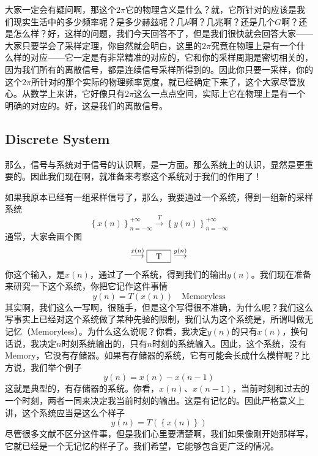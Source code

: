 \documentclass[a4paper,12pt]{article}
\begin{document}
大家一定会有疑问啊，那这个$2\pi$它的物理含义是什么？就，它所针对的应该是我们现实生活中的多少频率呢？是多少赫兹呢？几$k$啊？几兆啊？还是几个$G$啊？还是怎么样？好，这样的问题，我们今天回答不了，但是我们很快就会回答大家——大家只要学会了采样定理，你自然就会明白，这里的$2\pi$究竟在物理上是有一个什么样的对应——它一定是有非常精准的对应的，它和你的采样周期是密切相关的，因为我们所有的离散信号，都是连续信号采样所得到的。因此你只要一采样，你的这个$2\pi$所针对的那个实际的物理频率宽度，就已经确定下来了，这个大家尽管放心。从数学上来讲，它好像只有$2\pi$这么一点点空间，实际上它在物理上是有一个明确的对应的。好，这是我们的离散信号。

\subsection{Discrete System}\quad

那么，信号与系统对于信号的认识啊，是一方面。那么系统上的认识，显然是更重要的。因此我们现在啊，就准备来考察这个系统对于我们的作用了！


如果我原本已经有一组采样信号了，那么，我要通过一个系统，得到一组新的采样系统
\begin{equation}
    \left \{  x(n) \right \} _{n=-\infty}^{+\infty}\stackrel{T}{\longrightarrow}\left \{  y(n) \right \} _{n=-\infty}^{+\infty}
\end{equation}
通常，大家会画个图
\begin{equation}
   \stackrel{x(n)}{\longrightarrow}  \tikz[baseline=-0.5ex] \node[draw,inner sep=2pt,minimum width=1cm,minimum height=0.5cm]  {T};
\stackrel{y(n)}{\longrightarrow}
\end{equation}
你这个输入，是$x(n)$，通过了一个系统，得到我们的输出$y(n)$。我们现在准备来研究一下这个系统，你把它记作这件事情
\begin{equation}
    y(n) = T(x(n)) \quad \text{Memoryless}
\end{equation}
其实啊，我们这么一写啊，很随手，但是这个写得很不准确，为什么呢？我们这么写事实上已经对这个系统做了某种先验的限制，我们认为这个系统是，所谓叫做无记忆（Memoryless）。为什么这么说呢？你看，我决定$y(n)$的只有$x(n)$，换句话说，我决定$n$时刻系统输出的，只有$n$时刻的系统输入。因此，这个系统，没有Memory，它没有存储器。如果有存储器的系统，它有可能会长成什么模样呢？比方说，我们举个例子
\begin{equation}
    y(n) = x(n) - x(n - 1)
\end{equation}
这就是典型的，有存储器的系统。你看，$x(n)$、$x(n-1)$，当前时刻和过去的一个时刻，两者一同来决定我当前时刻的输出。这是有记忆的。因此严格意义上讲，这个系统应当是这么个样子
\begin{equation}
    y(n) = T(\left \{ x(n)\right \} )
\end{equation}
尽管很多文献不区分这件事，但是我们心里要清楚啊，我们如果像刚开始那样写，它就已经是一个无记忆的样子了。我们希望，它能够包含更广泛的情况。
\end{document}
